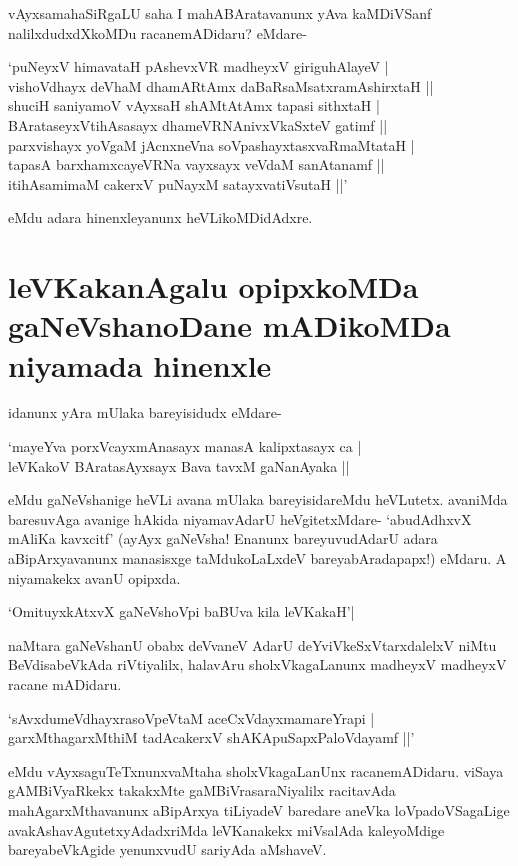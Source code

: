 vAyxsamahaSiRgaLU saha I mahABAratavanunx yAva kaMDiVSanf nalilxdudxdXkoMDu racanemADidaru? eMdare-

\begin{shloka}
`puNeyxV himavataH pAshevxVR madheyxV giriguhAlayeV |\label{118b}\\
vishoVdhayx deVhaM dhamARtAmx daBaRsaMsatxramAshirxtaH ||\\
shuciH saniyamoV vAyxsaH shAMtAtAmx tapasi sithxtaH |\\
BArataseyxVtihAsasayx dhameVRNA\s nivxVkaSxteV gatimf ||\\
parxvishayx yoVgaM jAcnxneVna soV\s pashayxtasxvaRmaMtataH |\\
tapasA barxhamxcayeVRNa vayxsayx veVdaM sanAtanamf ||\\
itihAsamimaM cakerxV puNayxM satayxvatiVsutaH ||'
\end{shloka}
eMdu adara hinenxleyanunx heVLikoMDidAdxre.

\section*{leVKakanAgalu opipxkoMDa gaNeVshanoDane mADikoMDa niyamada hinenxle}

idanunx yAra mUlaka bareyisidudx eMdare-

\begin{shloka}
`mayeYva porxVcayxmAnasayx manasA kalipxtasayx ca |\label{119c}\\
leVKakoV BAratasAyxsayx Bava tavxM gaNanAyaka ||
\end{shloka}

eMdu gaNeVshanige heVLi avana mUlaka bareyisidareMdu heVLutetx. avaniMda baresuvAga avanige hAkida niyamavAdarU heVgitetxMdare- `abudAdhxvX mAliKa kavxcitf'\label{119a} (ayAyx gaNeVsha! Enanunx bareyuvudAdarU adara aBipArxyavanunx manasisxge taMdukoLaLxdeV bareyabAradapapx!) eMdaru. A niyamakekx avanU opipxda.

\begin{shloka}
`OmituyxkAtxvX gaNeVshoV\s pi baBUva kila leVKakaH'|\label{119b}
\end{shloka}

naMtara gaNeVshanU obabx deVvaneV AdarU deYviVkeSxVtarxdalelxV niMtu BeVdisabeVkAda riVtiyalilx, halavAru sholxVkagaLanunx madheyxV madheyxV racane mADidaru. 

\begin{shloka}
`sAvxdumeVdhayxrasoV\s peVtaM aceCxVdayxmamareYrapi |\label{119d}\\
garxMthagarxMthiM tadAcakerxV shAKApuSapxPaloVdayamf ||'\label{119}
\end{shloka}
eMdu vAyxsaguTeTxnunxvaMtaha sholxVkagaLanUnx racanemADidaru. viSaya gAMBiVyaRkekx takakxMte gaMBiVrasaraNiyalilx racitavAda mahAgarxMthavanunx aBipArxya tiLiyadeV baredare aneVka loVpadoVSagaLige avakAshavAgutetxyAdadxriMda leVKanakekx miVsalAda kaleyoMdige bareyabeVkAgide yenunxvudU sariyAda aMshaveV.

